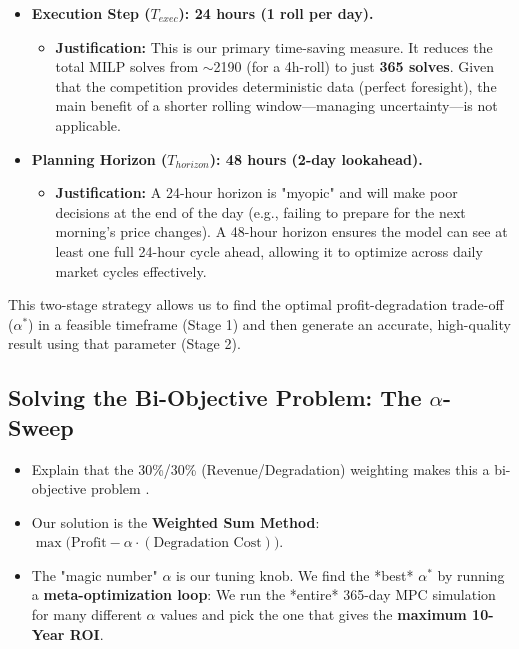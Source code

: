 \documentclass[11pt, a4paper]{article}
\begin{document}
\begin{itemize}
    \item \textbf{Execution Step ($T_{exec}$): 24 hours (1 roll per day).}
    \begin{itemize}
        \item \textbf{Justification:} This is our primary time-saving measure. It reduces the total MILP solves from $\sim$2190 (for a 4h-roll) to just \textbf{365 solves}. Given that the competition provides deterministic data (perfect foresight), the main benefit of a shorter rolling window---managing uncertainty---is not applicable.
    \end{itemize}
    \item \textbf{Planning Horizon ($T_{horizon}$): 48 hours (2-day lookahead).}
    \begin{itemize}
        \item \textbf{Justification:} A 24-hour horizon is "myopic" and will make poor decisions at the end of the day (e.g., failing to prepare for the next morning's price changes). A 48-hour horizon ensures the model can see at least one full 24-hour cycle ahead, allowing it to optimize across daily market cycles effectively.
    \end{itemize}
\end{itemize}
This two-stage strategy allows us to find the optimal profit-degradation trade-off ($\alpha^*$) in a feasible timeframe (Stage 1) and then generate an accurate, high-quality result using that parameter (Stage 2).

\subsection{Solving the Bi-Objective Problem: The $\alpha$-Sweep}
\begin{itemize}
    \item Explain that the 30\%/30\% (Revenue/Degradation) weighting makes this a bi-objective problem \cite{huawei2025}.
    \item Our solution is the \textbf{Weighted Sum Method}: $\max \Big( \text{Profit} - \alpha \cdot (\text{Degradation Cost}) \Big)$.
    \item The "magic number" $\alpha$ is our tuning knob. We find the *best* $\alpha^*$ by running a \textbf{meta-optimization loop}: We run the *entire* 365-day MPC simulation for many different $\alpha$ values and pick the one that gives the \textbf{maximum 10-Year ROI}.
\end{itemize}
\end{document}
